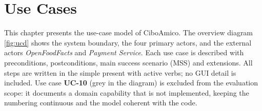 \chapter{Use Cases}\label{ch:usecases}

This chapter presents the use-case model of CiboAmico. The overview diagram
\ref{fig:ucd} shows the system boundary, the four primary actors, and the
external actors \emph{OpenFoodFacts} and \emph{Payment Service}. Each use case
is described with preconditions, postconditions, main success scenario (MSS)
and extensions. All steps are written in the simple present with active verbs;
no GUI detail is included. Use case \textbf{UC-10} (grey in the diagram) is
excluded from the evaluation scope: it documents a domain capability that is
not implemented, keeping the numbering continuous and the model coherent with
the code.

